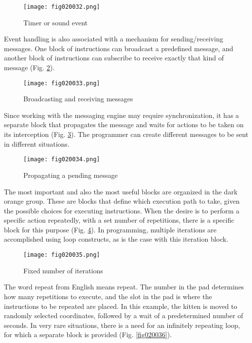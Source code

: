\begin{figure}[H]
   \centering
   \texttt{[image: fig020032.png]}
   \caption{Timer or sound event}
\label{fig020032}
\end{figure}

Event handling is also associated with a mechanism for sending/receiving messages. One block of instructions can broadcast a predefined message, and another block of instructions can subscribe to receive exactly that kind of message (Fig. \ref{fig020033}).

\begin{figure}[H]
   \centering
   \texttt{[image: fig020033.png]}
   \caption{Broadcasting and receiving messages}
\label{fig020033}
\end{figure}

Since working with the messaging engine may require synchronization, it has a separate block that propagates the message and waits for actions to be taken on its interception (Fig. \ref{fig020034}). The programmer can create different messages to be sent in different situations.

\begin{figure}[H]
   \centering
   \texttt{[image: fig020034.png]}
   \caption{Propagating a pending message}
\label{fig020034}
\end{figure}

The most important and also the most useful blocks are organized in the dark orange group. These are blocks that define which execution path to take, given the possible choices for executing instructions. When the desire is to perform a specific action repeatedly, with a set number of repetitions, there is a specific block for this purpose (Fig. \ref{fig020035}). In programming, multiple iterations are accomplished using loop constructs, as is the case with this iteration block.

\begin{figure}[H]
   \centering
   \texttt{[image: fig020035.png]}
   \caption{Fixed number of iterations}
\label{fig020035}
\end{figure}

The word repeat from English means repeat. The number in the pad determines how many repetitions to execute, and the slot in the pad is where the instructions to be repeated are placed. In this example, the kitten is moved to randomly selected coordinates, followed by a wait of a predetermined number of seconds. In very rare situations, there is a need for an infinitely repeating loop, for which a separate block is provided (Fig. \ref{fig020036}).

